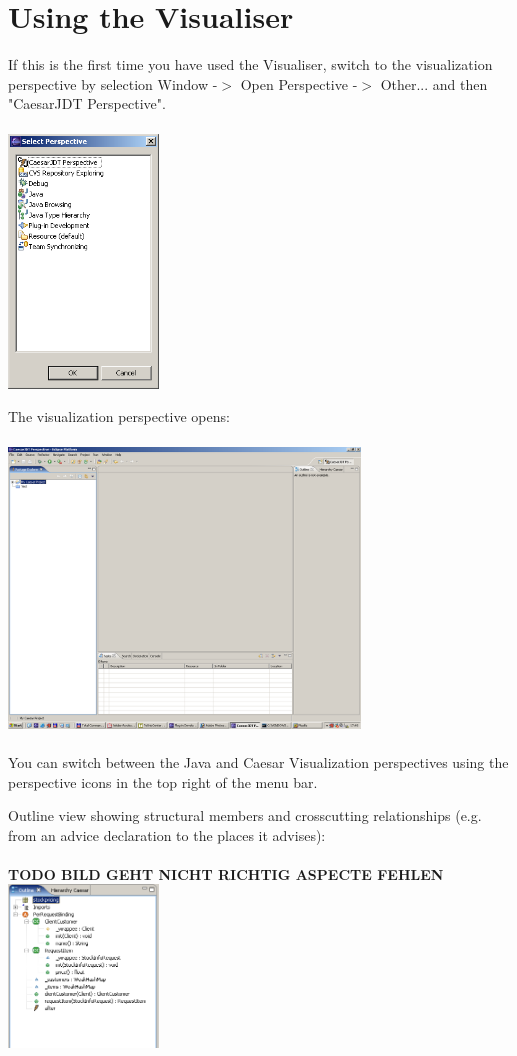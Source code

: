 \section{Using the Visualiser}
If this is the first time you have used the Visualiser, switch to the visualization perspective by selection Window -$>$ Open Perspective -$>$ Other... and then "CaesarJDT Perspective".\\\\
\includegraphics[width=0.3\textwidth]{images/select_persp.png}

The visualization perspective opens:\\\\
\includegraphics[width=0.7\textwidth]{images/openpersp.png}\\\\

You can switch between the Java and Caesar Visualization perspectives using the perspective icons in the top right of the menu bar.\newpage

Outline view showing structural members and crosscutting relationships (e.g. from an advice declaration to the places it advises):\\\\
\textbf{TODO BILD GEHT NICHT RICHTIG ASPECTE FEHLEN}\\
\includegraphics[width=0.30\textwidth]{images/outline.png}\\\\

